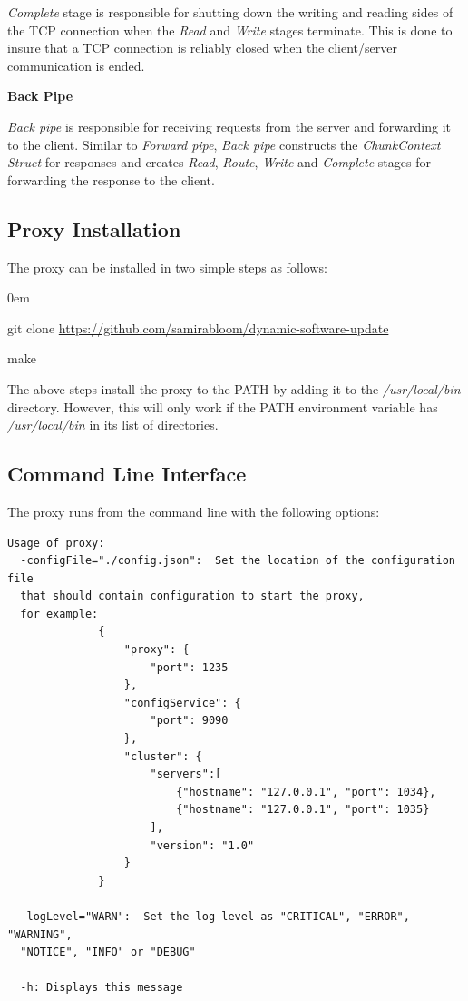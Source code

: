 \documentclass[a4paper,11pt,twoside]{article}
\begin{document}
\noindent 
\textit{Complete} stage is responsible for shutting down the writing and reading sides of the TCP connection when the \textit{Read} and \textit{Write} stages terminate. This is done to insure that a TCP connection is reliably closed when the client/server communication is ended.\bigskip 

\noindent
\textbf{Back Pipe}

\noindent
\textit{Back pipe} is responsible for receiving requests from the server and forwarding it to the client. Similar to \textit{Forward pipe}, \textit{Back pipe} constructs the \textit{ChunkContext Struct} for responses and creates \textit{Read}, \textit{Route}, \textit{Write} and \textit{Complete} stages for forwarding the response to the client.

\subsection{Proxy Installation}
The proxy can be installed in two simple steps as follows:
\begin{list}{-}{}
  \itemsep0em
  \item git clone \url {https://github.com/samirabloom/dynamic-software-update} 
  \item make
\end{list}

\noindent
The above steps install the proxy to the PATH by adding it to the \textit{/usr/local/bin} directory. However, this will only work if the PATH environment variable has \textit{/usr/local/bin} in its list of directories. 

\subsection{Command Line Interface}
The proxy runs from the command line with the following options:\bigskip

\begin{lstlisting}[language=terminal]
Usage of proxy:
  -configFile="./config.json":  Set the location of the configuration file 
  that should contain configuration to start the proxy, 
  for example:
              {
                  "proxy": {
                      "port": 1235
                  },
                  "configService": {
                      "port": 9090
                  },
                  "cluster": {
                      "servers":[
                          {"hostname": "127.0.0.1", "port": 1034},
                          {"hostname": "127.0.0.1", "port": 1035}
                      ],
                      "version": "1.0"
                  }
              }

  -logLevel="WARN":  Set the log level as "CRITICAL", "ERROR", "WARNING", 
  "NOTICE", "INFO" or "DEBUG"

  -h: Displays this message
\end{lstlisting} 
\end{document}
